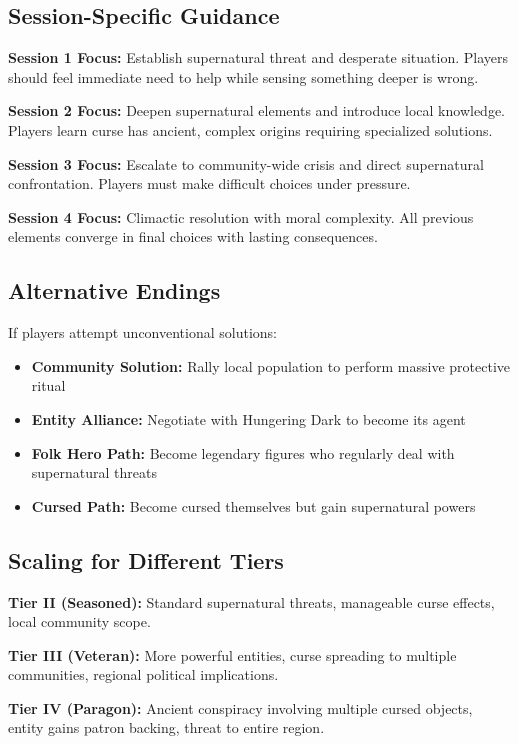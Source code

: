 \documentclass[11pt]{article}
\begin{document}
\subsection{Session-Specific Guidance}

\textbf{Session 1 Focus:} Establish supernatural threat and desperate situation. Players should feel immediate need to help while sensing something deeper is wrong.

\textbf{Session 2 Focus:} Deepen supernatural elements and introduce local knowledge. Players learn curse has ancient, complex origins requiring specialized solutions.

\textbf{Session 3 Focus:} Escalate to community-wide crisis and direct supernatural confrontation. Players must make difficult choices under pressure.

\textbf{Session 4 Focus:} Climactic resolution with moral complexity. All previous elements converge in final choices with lasting consequences.

\subsection{Alternative Endings}

If players attempt unconventional solutions:
\begin{itemize}
\item \textbf{Community Solution:} Rally local population to perform massive protective ritual
\item \textbf{Entity Alliance:} Negotiate with Hungering Dark to become its agent
\item \textbf{Folk Hero Path:} Become legendary figures who regularly deal with supernatural threats
\item \textbf{Cursed Path:} Become cursed themselves but gain supernatural powers
\end{itemize}

\subsection{Scaling for Different Tiers}

\textbf{Tier II (Seasoned):} Standard supernatural threats, manageable curse effects, local community scope.

\textbf{Tier III (Veteran):} More powerful entities, curse spreading to multiple communities, regional political implications.

\textbf{Tier IV (Paragon):} Ancient conspiracy involving multiple cursed objects, entity gains patron backing, threat to entire region.
\end{document}

